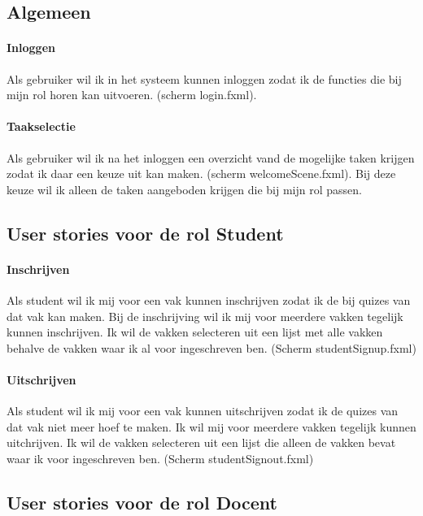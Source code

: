 \documentclass[11pt, a4paper]{article}
\begin{document}
\subsection{Algemeen}

\paragraph{Inloggen}
Als gebruiker wil ik in het systeem kunnen inloggen zodat ik de functies die bij mijn rol horen kan uitvoeren. (scherm login.fxml).

\paragraph{Taakselectie}
Als gebruiker wil ik na het inloggen een overzicht vand de mogelijke taken krijgen zodat ik daar een keuze uit kan maken. (scherm welcomeScene.fxml).
Bij deze keuze wil ik alleen de taken aangeboden krijgen die bij mijn rol passen.

\subsection{User stories voor de rol Student}

\paragraph{Inschrijven}
Als student wil ik mij voor een vak kunnen inschrijven zodat ik de bij quizes van dat vak kan maken.
Bij de inschrijving wil ik mij voor meerdere vakken tegelijk kunnen inschrijven.
Ik wil de vakken selecteren uit een lijst met alle vakken behalve de vakken waar ik al voor ingeschreven ben.
(Scherm studentSignup.fxml)

\paragraph{Uitschrijven}
Als student wil ik mij voor een vak kunnen uitschrijven zodat ik de quizes van dat vak niet meer hoef te maken.
Ik wil mij voor meerdere vakken tegelijk kunnen uitchrijven.
Ik wil de vakken selecteren uit een lijst die alleen de vakken bevat waar ik voor ingeschreven ben.
(Scherm studentSignout.fxml)

\subsection{User stories voor de rol Docent}
\end{document}
